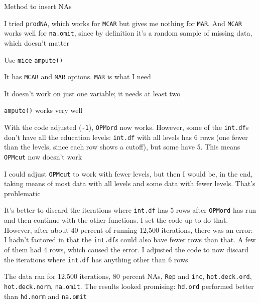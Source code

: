 \begin{coi}
\begin{coi}
\begin{coi}
					\end{coi}
			\end{coi}
		\item Method to insert NAs
			\begin{coi}
				\item I tried \texttt{prodNA}, which works for \texttt{MCAR} but gives me nothing for \texttt{MAR}. And \texttt{MCAR} works well for \texttt{na.omit}, since by definition it's a random sample of missing data, which doesn't matter 
				\item Use \texttt{mice} \texttt{ampute()}
					\begin{coi}
						\item It has \texttt{MCAR} and \texttt{MAR} options. \texttt{MAR} is what I need
						\item It doesn't work on just one variable; it needs at least two
						\item \texttt{ampute()} works very well
					\end{coi}
			\end{coi}
		\item With the code adjusted (\texttt{-1}), \texttt{OPMord} now works. However, some of the \texttt{int.df}s don't have all the education levels: \texttt{int.df} with all levels has 6 rows (one fewer than the levels, since each row shows a cutoff), but some have 5. This means \texttt{OPMcut} now doesn't work
			\begin{coi}
				\item I could adjust \texttt{OPMcut} to work with fewer levels, but then I would be, in the end, taking means of most data with all levels and some data with fewer levels. That's problematic
				\item It's better to discard the iterations where \texttt{int.df} has 5 rows after \texttt{OPMord} has run and then continue with the other functions. I set the code up to do that. However, after about 40 percent of running 12,500 iterations, there was an error: I hadn't factored in that the \texttt{int.df}s could also have fewer rows than that. A few of them had 4 rows, which caused the error. I adjusted the code to now discard the iterations where \texttt{int.df} has anything other than 6 rows
			\end{coi}
		\item The data ran for 12,500 iterations, 80 percent NAs, \texttt{Rep} and \texttt{inc}, \texttt{hot.deck.ord}, \texttt{hot.deck.norm}, \texttt{na.omit}. The results looked promising: \texttt{hd.ord} performed better than \texttt{hd.norm} and \texttt{na.omit}

\end{coi}
